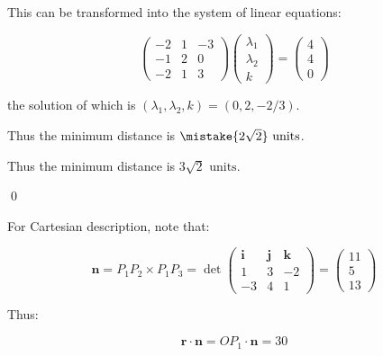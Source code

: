\documentclass[12pt]{article}
\begin{document}
This can be transformed into the system of linear equations:

\begin{equation}
    \begin{pmatrix}
        -2 & 1 & -3 \\
        -1 & 2 & 0  \\
        -2 & 1 & 3
    \end{pmatrix}
    \begin{pmatrix}
        \lambda_{1} \\
        \lambda_{2} \\
        k
    \end{pmatrix}
    =
    \begin{pmatrix}
        4 \\
        4 \\
        0
    \end{pmatrix}
\end{equation}

the solution of which is $(\lambda_{1}, \lambda_{2}, k) = (0, 2, -2/3)$.

Thus the minimum distance is $\mistake{2\sqrt{2}} \text{ units}$.

\begin{correction}
    Thus the minimum distance is $3\sqrt{2} \text{ units}$.
\end{correction}
\qed


For Cartesian description, note that:

\begin{equation}
    \mathbf{n} = P_{1} P_{2} \times P_{1} P_{3} =
    \det{
        \begin{pmatrix}
            \mathbf{i} & \mathbf{j} & \mathbf{k} \\
            1          & 3          & -2         \\
            -3         & 4          & 1
        \end{pmatrix}}
    =
    \begin{pmatrix}
        11 \\
        5  \\
        13
    \end{pmatrix}
\end{equation}

Thus:

\begin{equation}
    \mathbf{r} \cdot \mathbf{n} = OP_{1} \cdot \mathbf{n} = 30
\end{equation}
\end{document}
